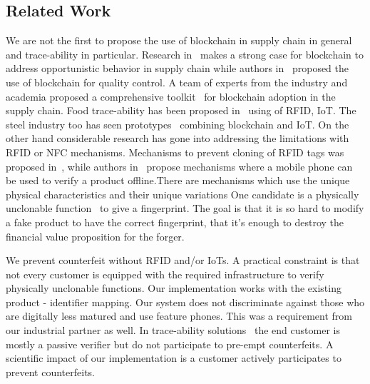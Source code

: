 \documentclass{article}
\begin{document}
\subsection{Related Work} We are not the first to propose the use of blockchain in supply chain in general and trace-ability in particular. Research in~\cite{Schmidt} makes a strong case for blockchain to address opportunistic behavior in supply chain while authors in~\cite{chen} proposed the use of blockchain for quality control. A team of experts from the industry and academia proposed a comprehensive toolkit~\cite{wef} for blockchain adoption in the supply chain. Food trace-ability has been proposed in~\cite{tian,walmart,jun} using of RFID, IoT. The steel industry too has seen prototypes~\cite{cao} combining blockchain and IoT. 
On the other hand considerable research has gone into addressing the limitations with RFID or NFC mechanisms. Mechanisms to prevent cloning of RFID tags was proposed in~\cite{lejla}, while authors in~\cite{nfc} propose mechanisms where a mobile phone can be used to verify a product offline.There are mechanisms which use the unique physical characteristics and their unique variations %
One candidate is a physically unclonable function~\cite{pappu} to give a fingerprint. 
The goal is that it is so hard to modify a fake product to have the correct fingerprint, that it's enough to destroy the financial value proposition for the forger. %

We prevent counterfeit without RFID and/or IoTs. A practical constraint is that not every customer is equipped with the required infrastructure to verify physically unclonable functions. Our implementation works with the existing product - identifier mapping. Our system does not discriminate against those who are digitally less matured and use feature phones. This was a requirement from our industrial partner as well. In trace-ability solutions~\cite{tian,walmart,jun} the end customer is mostly a passive verifier but do not participate to pre-empt counterfeits. 
A scientific impact of our implementation is a customer actively participates to prevent counterfeits.   
\end{document}
